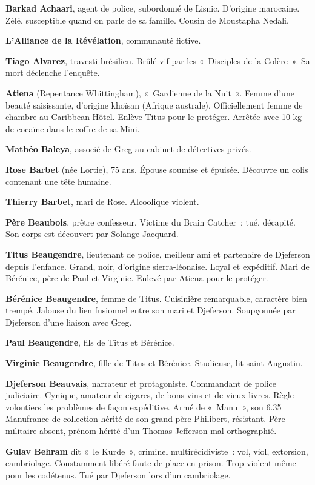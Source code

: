 \textbf{Barkad Achaari}, agent de police, subordonné de Lisnic. D'origine marocaine. Zélé, susceptible quand on parle de sa famille. Cousin de Moustapha Nedali.

\textbf{L'Alliance de la Révélation}, communauté fictive.

\textbf{Tiago Alvarez}, travesti brésilien. Brûlé vif par les «~Disciples de la Colère~». Sa mort déclenche l'enquête.

\textbf{Atiena} (Repentance Whittingham), «~Gardienne de la Nuit~». Femme d'une beauté saisissante, d'origine khoïsan (Afrique australe). Officiellement femme de chambre au Caribbean Hôtel. Enlève Titus pour le protéger. Arrêtée avec 10 kg de cocaïne dans le coffre de sa Mini.

\textbf{Mathéo Baleya}, associé de Greg au cabinet de détectives privés.

\textbf{Rose Barbet} (née Lortie), 75 ans. Épouse soumise et épuisée. Découvre un colis contenant une tête humaine.

\textbf{Thierry Barbet}, mari de Rose. Alcoolique violent.

\textbf{Père Beaubois}, prêtre confesseur. Victime du Brain Catcher~: tué, décapité. Son corps est découvert par Solange Jacquard.

\textbf{Titus Beaugendre}, lieutenant de police, meilleur ami et partenaire de Djeferson depuis l'enfance. Grand, noir, d'origine sierra-léonaise. Loyal et expéditif. Mari de Bérénice, père de Paul et Virginie. Enlevé par Atiena pour le protéger.

\textbf{Bérénice Beaugendre}, femme de Titus. Cuisinière remarquable, caractère bien trempé. Jalouse du lien fusionnel entre son mari et Djeferson. Soupçonnée par Djeferson d'une liaison avec Greg.

\textbf{Paul Beaugendre}, fils de Titus et Bérénice.

\textbf{Virginie Beaugendre}, fille de Titus et Bérénice. Studieuse, lit saint Augustin.

\textbf{Djeferson Beauvais}, narrateur et protagoniste. Commandant de police judiciaire. Cynique, amateur de cigares, de bons vins et de vieux livres. Règle volontiers les problèmes de façon expéditive. Armé de «~Manu~», son 6.35 Manufrance de collection hérité de son grand-père Philibert, résistant. Père militaire absent, prénom hérité d'un Thomas Jefferson mal orthographié.

\textbf{Gulav Behram} dit «~le Kurde~», criminel multirécidiviste~: vol, viol, extorsion, cambriolage. Constamment libéré faute de place en prison. Trop violent même pour les codétenus. Tué par Djeferson lors d'un cambriolage.

